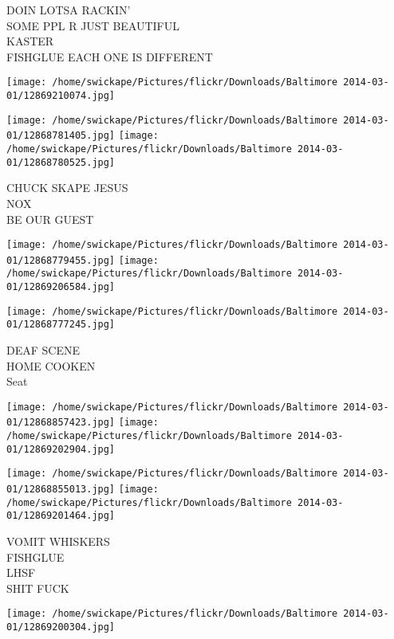 \documentclass[10pt,letterpaper]{article}
\begin{document}
DOIN LOTSA RACKIN'\\
SOME PPL R JUST BEAUTIFUL\\
KASTER\\
FISHGLUE EACH ONE IS DIFFERENT\\
\pagebreak

\texttt{[image: /home/swickape/Pictures/flickr/Downloads/Baltimore 2014-03-01/12869210074.jpg]}

\vspace{0.25in}
\texttt{[image: /home/swickape/Pictures/flickr/Downloads/Baltimore 2014-03-01/12868781405.jpg]}
\texttt{[image: /home/swickape/Pictures/flickr/Downloads/Baltimore 2014-03-01/12868780525.jpg]}

CHUCK SKAPE JESUS\\
NOX\\
BE OUR GUEST\\
\pagebreak

\texttt{[image: /home/swickape/Pictures/flickr/Downloads/Baltimore 2014-03-01/12868779455.jpg]}
\texttt{[image: /home/swickape/Pictures/flickr/Downloads/Baltimore 2014-03-01/12869206584.jpg]}

\vspace{0.25in}
\texttt{[image: /home/swickape/Pictures/flickr/Downloads/Baltimore 2014-03-01/12868777245.jpg]}

DEAF SCENE\\
HOME COOKEN\\
Seat\\
\pagebreak

\texttt{[image: /home/swickape/Pictures/flickr/Downloads/Baltimore 2014-03-01/12868857423.jpg]}
\texttt{[image: /home/swickape/Pictures/flickr/Downloads/Baltimore 2014-03-01/12869202904.jpg]}

\texttt{[image: /home/swickape/Pictures/flickr/Downloads/Baltimore 2014-03-01/12868855013.jpg]}
\texttt{[image: /home/swickape/Pictures/flickr/Downloads/Baltimore 2014-03-01/12869201464.jpg]}

VOMIT WHISKERS\\
FISHGLUE\\
LHSF\\
SHIT FUCK\\
\pagebreak

\texttt{[image: /home/swickape/Pictures/flickr/Downloads/Baltimore 2014-03-01/12869200304.jpg]}
\end{document}
